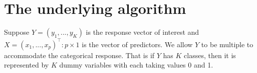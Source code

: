 \documentclass[nojss]{jss}
\numberwithin{equation}{section}
\begin{document}


\section{The underlying algorithm} \label{sec:models}

Suppose $ Y = (y_1, ..., y_K) $ is the response vector of interest and $ X = (x_1, ..., x_p)^\top : p \times 1 $ is the vector of predictors.  We allow $ Y$ to be multiple to accommodate the categorical response. That is if $ Y$ has $K$ classes, then it is represented by $ K $ dummy variables with each taking values 0 and 1.
\end{document}
